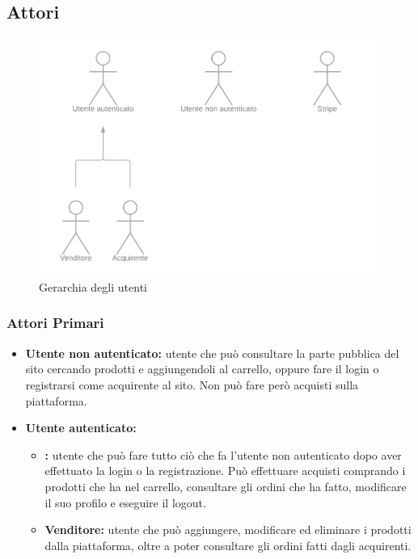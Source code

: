 \subsection{Attori} \label{Attori}

\begin{figure}[ht]
    \centering
    \includegraphics[width=\textwidth]{Immagini/DiagrammiUC/Attori.png}
    \caption{Gerarchia degli utenti} 
    \label{fig:Registrazione}
\end{figure}

\subsubsection{Attori Primari}
\begin{itemize}
    \item \textbf{Utente non autenticato:} utente che può consultare la parte pubblica del sito cercando prodotti e aggiungendoli al carrello, oppure fare il login o registrarsi come acquirente al sito. Non può fare però acquisti sulla piattaforma.
    \item \textbf{Utente autenticato:}
    \begin{itemize}
        \item \textbf{:} utente che può fare tutto ciò che fa l'utente non autenticato dopo aver effettuato la login o la registrazione. Può effettuare acquisti comprando i prodotti che ha nel carrello, consultare gli ordini che ha fatto, modificare il suo profilo e eseguire il logout.
        \item \textbf{Venditore:} utente che può aggiungere, modificare ed eliminare i prodotti dalla piattaforma, oltre a poter consultare gli ordini fatti dagli acquirenti.
    \end{itemize}
\end{itemize}
